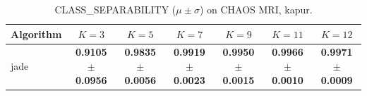 \begin{table}[htbp]
\centering
\caption{CLASS_SEPARABILITY ($\mu \pm \sigma$) on CHAOS MRI, kapur.}
\label{tab:exp2-kapur-class_separability}
\begin{tabular}{lcccccc}
\toprule
Algorithm & $K=3$ & $K=5$ & $K=7$ & $K=9$ & $K=11$ & $K=12$ \\
\midrule
jade & \textbf{0.9105 $\pm$ 0.0956} & \textbf{0.9835 $\pm$ 0.0056} & \textbf{0.9919 $\pm$ 0.0023} & \textbf{0.9950 $\pm$ 0.0015} & \textbf{0.9966 $\pm$ 0.0010} & \textbf{0.9971 $\pm$ 0.0009} \\
\bottomrule
\end{tabular}
\end{table}